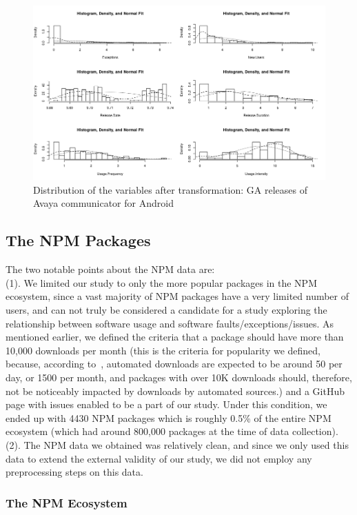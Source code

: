 \documentclass[smallcondensed]{svjour3}     %
\begin{document}
\begin{figure}[!t]
\centering
\includegraphics[width=0.9\linewidth]{distr}%
\caption{Distribution of the variables after transformation: GA releases of Avaya communicator for Android}
\label{fig:distr}
\end{figure}

\subsection{The NPM Packages}
The two notable points about the NPM data are:\\ (1). We limited our study to only the more popular packages in the NPM ecosystem, since a vast majority of NPM packages have a very limited number of users, and can not truly be considered a candidate for a study exploring the relationship between software usage and software faults/exceptions/issues. As mentioned earlier, we defined the criteria that a package should have more than 10,000 downloads per month (this is the criteria for popularity we defined, because, according to~\cite{npmdl}, automated downloads are expected to be
around 50 per day, or 1500 per month, and packages with over 10K
downloads should, therefore, not be noticeably impacted by 
 downloads by automated sources.) and a GitHub page with issues enabled to be a part of our study. Under this condition, we ended up with 4430 NPM packages which is roughly 0.5\% of the entire NPM ecosystem (which had around 800,000 packages at the time of data collection).\\
(2). The NPM data we obtained was relatively clean, and since we only used this data to extend the external validity of our study, we did not employ any preprocessing steps on this data. 

\subsubsection{The NPM Ecosystem}
\end{document}

